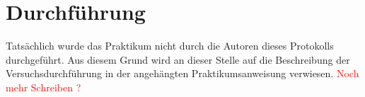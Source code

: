 \section{Durchführung}
\label{sec:durchfuerung}
Tatsächlich wurde das Praktikum nicht durch die Autoren dieses Protokolls durchgeführt. Aus diesem Grund wird an dieser Stelle auf die Beschreibung der Versuchsdurchführung in der angehängten Praktikumsanweisung verwiesen.
\textcolor{red}{Noch mehr Schreiben ?}

\newpage
